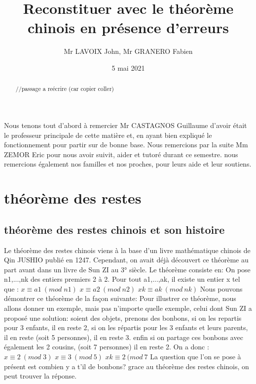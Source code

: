 \documentclass[a4paper, 11pt]{article}
\begin{document}
\title{Reconstituer avec le théorème chinois en présence d’erreurs}
\author{Mr LAVOIX John, Mr GRANERO Fabien }
\date{5 mai 2021}



\begin{abstract}

//passage a reécrire (car copier coller) 
\end{abstract}

\newpage

\tableofcontents

\newpage
\begin{flushleft}
    Nous tenons tout d'abord à remercier Mr CASTAGNOS Guillaume d'avoir était le professeur principale de cette matière et,
en ayant bien expliqué le fonctionnement pour partir sur de bonne base. Nous remercions par la suite Mm ZEMOR Eric pour nous 
avoir suivit, aider et tutoré durant ce semestre.
\newline 
nous remercions également nos familles et nos proches, pour leurs aide et leur soutiens.
\end{flushleft}

\newpage
\section{théorème des restes}
\subsection{théorème des restes chinois et son histoire}
Le théorème des restes chinois viens à la base d’un livre mathématique chinois de Qin JUSHIO publié en 1247. Cependant, on avait déjà découvert ce théorème au part avant dans un livre de Sun ZI au 3° siècle. Le théorème consiste en:
On pose n1,...,nk des entiers premiers 2 à 2. Pour tout a1,...,ak, il existe un entier x tel que :
\newline
$ x\equiv a1 \: (mod \;  n1)$ 
\newline
$ x\equiv a2 \: (mod \: n2)$
\newline
$ xk \equiv ak \:(mod\: nk)$
\newline
Nous pouvons démontrer ce théorème de la façon suivante:
\newline
\newline
Pour illustrer ce théorème, nous allons donner un exemple, mais pas n'importe quelle exemple, celui dont Sun ZI a proposé une solution:
\newline
soient des objets, prenons des bonbons, si on les repartis pour 3 enfants, il en reste 2, si on les répartis
pour les 3 enfants et leurs parents, il en reste (soit 5 personnes), il en reste 3. enfin si on partage ces bonbons avec également les 2 cousins,
(soit 7 personnes) il en reste 2. On a donc :
\newline 
$ x\equiv 2 \: (mod \;  3)$ 
\newline
$ x\equiv 3 \: (mod \: 5)$
\newline
$ xk \equiv 2 \:(mod\: 7$
\newline
La question que l'on se pose à présent est combien y a t'il de bonbons?
\newline
grace au théorème des restes chinois, on peut trouver la réponse.
\end{document}
